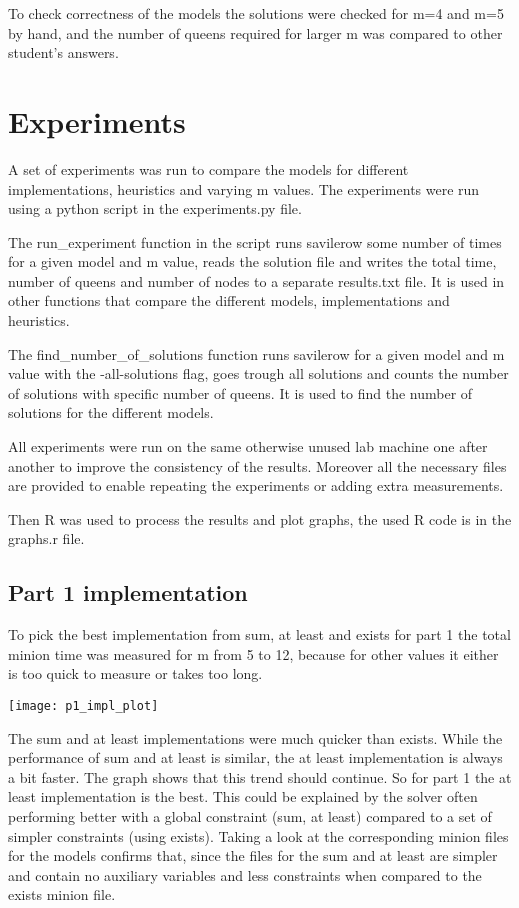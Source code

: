 \documentclass{article}
\begin{document}
To check correctness of the models the solutions were checked for m=4 and m=5 by hand, and the number of queens required  for larger m was compared to other student's answers.

\section{Experiments}

A set of experiments was run to compare the models for different implementations, heuristics and varying m values. The experiments were run using a python script in the experiments.py file.

The run\_experiment function in the script runs savilerow some number of times for a given model and m value, reads the solution file and writes the total time, number of queens and number of nodes to a separate results.txt file. It is used in other functions that compare the different models, implementations and heuristics.

The find\_number\_of\_solutions function runs savilerow for a given model and m value with the -all-solutions flag, goes trough all solutions and counts the number of solutions with specific number of queens. It is used to find the number of solutions for the different models.

All experiments were run on the same otherwise unused lab machine one after another to improve the consistency of the results. Moreover all the necessary files are provided to enable repeating the experiments or adding extra measurements.

Then R was used to process the results and plot graphs, the used R code is in the graphs.r file.

\subsection{Part 1 implementation}

To pick the best implementation from sum, at least and exists for part 1 the total minion time was measured for m from 5 to 12, because for other values it either is too quick to measure or takes too long.

\texttt{[image: p1\_impl\_plot]}

The sum and at least implementations were much quicker than exists. While the performance of sum and at least is similar, the at least implementation is always a bit faster. The graph shows that this trend should continue. So for part 1 the at least implementation is the best. This could be explained by the solver often performing better with a global constraint (sum, at least) compared to a set of simpler constraints (using exists). Taking a look at the corresponding minion files for the models confirms that, since the files for the sum and at least are simpler and contain no auxiliary variables and less constraints when compared to the exists minion file.
\end{document}
